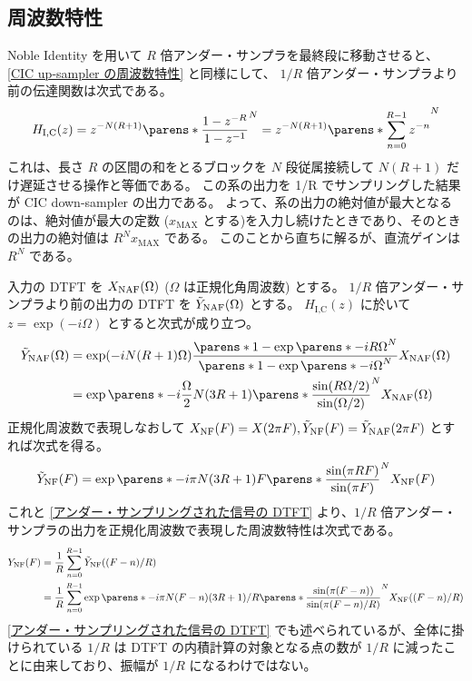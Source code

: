     \subsection{周波数特性}
        Noble Identity を用いて $R$ 倍アンダー・サンプラを最終段に移動させると、\ref{CIC up-sampler の周波数特性} と同様にして、 $1/R$ 倍アンダー・サンプラより前の伝達関数は次式である。
        \[ H_\text{I,C}(z) = z^{-N(R+1)}\parens*{\frac{1-z^{-R}}{1-z^{-1}}}^N = z^{-N(R+1)}\parens*{\sum_{n=0}^{R-1}z^{-n}}^N \]
        これは、長さ $R$ の区間の和をとるブロックを $N$ 段従属接続して $N(R+1)$ だけ遅延させる操作と等価である。
        この系の出力を 1/R でサンプリングした結果が CIC down-sampler の出力である。
        よって、系の出力の絶対値が最大となるのは、絶対値が最大の定数 ($x_\text{MAX}$ とする)を入力し続けたときであり、そのときの出力の絶対値は $R^N x_\text{MAX}$ である。
        このことから直ちに解るが、直流ゲインは $R^N$ である。
        \par
        入力の DTFT を $X_\text{NAF}(\Omega)$ ($\Omega$ は正規化角周波数) とする。
        $1/R$ 倍アンダー・サンプラより前の出力の DTFT を $\tilde{Y}_\text{NAF}(\Omega)$ とする。
        $H_\text{I,C}(z)$ に於いて $z = \exp(-i\Omega)$ とすると次式が成り立つ。
        \begin{align*}
            \tYNAF(\Omega) &= \exp(-iN(R+1)\Omega)\frac{\parens*{1-\exp\parens*{-iR\Omega}}^N}{\parens*{1-\exp\parens*{-i\Omega}}^N}\XNAF(\Omega) \\
            &= \exp\parens*{-i\frac{\Omega}{2}N(3R+1)}\parens*{\frac{\sin(R\Omega/2)}{\sin(\Omega/2)}}^N \XNAF(\Omega)
        \end{align*}
        正規化周波数で表現しなおして $X_\text{NF}(F) = X(2\pi F), \tilde{Y}_\text{NF}(F) = \tilde{Y}_\text{NAF}(2\pi F)$ とすれば次式を得る。
        \[ \tYNF(F) = \exp\parens*{-i\pi N(3R+1)F}\parens*{\frac{\sin(\pi R F)}{\sin(\pi F)}}^N \XNF(F) \]
        これと \ref{アンダー・サンプリングされた信号の DTFT} より、$1/R$ 倍アンダー・サンプラの出力を正規化周波数で表現した周波数特性は次式である。
        \begin{align}
            \YNF(F) &= \frac{1}{R}\sum_{n=0}^{R-1} \tYNF((F-n)/R) \nonumber \\
            &= \frac{1}{R}\sum_{n=0}^{R-1} \exp\parens*{-i\pi N(F-n)(3R+1)/R}\parens*{\frac{\sin(\pi(F-n))}{\sin(\pi(F-n)/R)}}^N \XNF((F-n)/R) \label{equation:CIC down-sampler の周波数特性}
        \end{align}
        \ref{アンダー・サンプリングされた信号の DTFT} でも述べられているが、全体に掛けられている $1/R$ は DTFT の内積計算の対象となる点の数が $1/R$ に減ったことに由来しており、振幅が $1/R$ になるわけではない。
